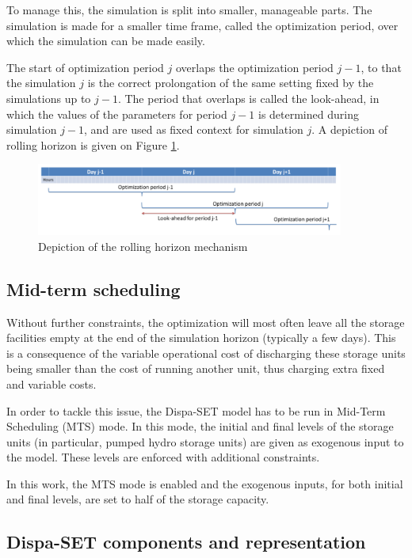To manage this, the simulation is split into smaller, manageable parts. The simulation is made for a smaller time frame, called the optimization period, over which the simulation can be made easily.

The start of optimization period $j$ overlaps the optimization period $j-1$, to that the simulation $j$ is the correct prolongation of the same setting fixed by the simulations up to $j-1$. The period that overlaps is called the look-ahead, in which the values of the parameters for period $j-1$ is determined during simulation $j-1$, and are used as fixed context for simulation $j$. A depiction of rolling horizon is given on Figure \ref{fig:rolling-horizon}.

\begin{figure}[h]
    \centering
    \includegraphics[width=0.9\textwidth]{resources/images/rolling_horizon.png}
    \caption{Depiction of the rolling horizon mechanism}
    \label{fig:rolling-horizon}
\end{figure}

\subsection{Mid-term scheduling}

Without further constraints, the optimization will most often leave all the storage facilities empty at the end of the simulation horizon (typically a few days). This is a consequence of the variable operational cost of discharging these storage units being smaller than the cost of running another unit, thus charging extra fixed and variable costs.

In order to tackle this issue, the Dispa-SET model has to be run in Mid-Term Scheduling (MTS) mode. In this mode, the initial and final levels of the storage units (in particular, pumped hydro storage units) are given as exogenous input to the model. These levels are enforced with additional constraints.

In this work, the MTS mode is enabled and the exogenous inputs, for both initial and final levels, are set to half of the storage capacity.

\subsection{Dispa-SET components and representation}

